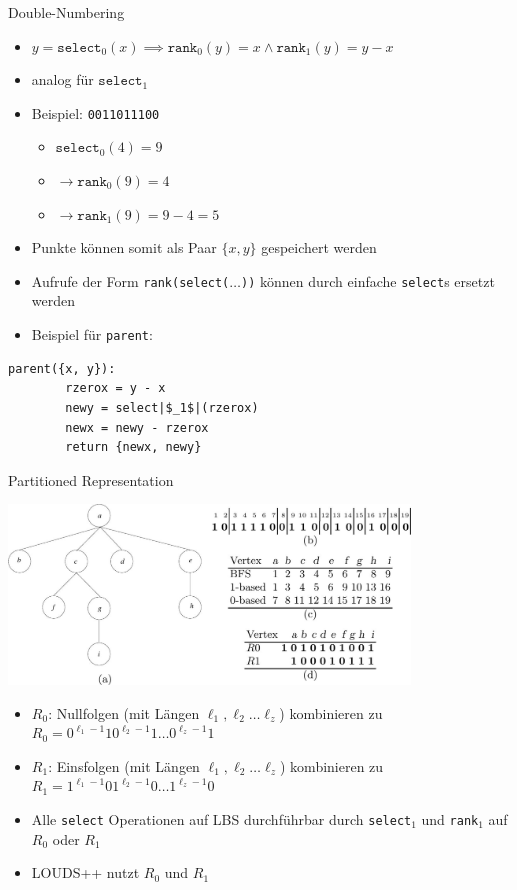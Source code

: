 \documentclass[ngerman,aspectratio=169,10pt]{beamer}
\begin{document}
\begin{frame}[fragile]{Double-Numbering}
    \begin{itemize}
        \item $y=\texttt{select}_0(x)\implies \texttt{rank}_0(y)=x\wedge \texttt{rank}_1(y)=y-x$
        \item analog für $\texttt{select}_1$
        \pause
        \item Beispiel: \texttt{0011011100}
            \begin{itemize}
                \item $\texttt{select}_0(4)=9$
                \item $\rightarrow \texttt{rank}_0(9)=4$
                \item $\rightarrow \texttt{rank}_1(9)=9-4=5$
            \end{itemize}
        \pause
        \item Punkte können somit als Paar $\{x, y\}$ gespeichert werden
        \item Aufrufe der Form \texttt{rank(select($\dots$))} können durch einfache \texttt{select}s ersetzt werden
        \item Beispiel für \texttt{parent}:
    \end{itemize}
	\begin{lstlisting}[escapechar=|]
	parent({x, y}):
		rzerox = y - x
		newy = select|$_1$|(rzerox)
		newx = newy - rzerox
		return {newx, newy}
	\end{lstlisting}
\end{frame}

\begin{frame}{Partitioned Representation}
    \begin{center}
        \includegraphics[width=0.8\textwidth]{LOUDS.jpg}
    \end{center}
    \begin{itemize}
        \item $R_0$: Nullfolgen (mit Längen $\ell_1,\ell_2\ldots\ell_z$) kombinieren zu $R_0=0^{\ell_1-1}10^{\ell_2-1}1\ldots0^{\ell_z-1}1$
        \item  $R_1$: Einsfolgen (mit Längen $\ell_1,\ell_2\ldots\ell_z$) kombinieren zu $R_1=1^{\ell_1-1}01^{\ell_2-1}0\ldots1^{\ell_z-1}0$
        \item Alle \texttt{select} Operationen auf LBS durchführbar durch \texttt{select}$_1$ und \texttt{rank}$_1$ auf $R_0$ oder $R_1$
        \item LOUDS++ nutzt $R_0$ und $R_1$
    \end{itemize}
\end{frame}
\end{document}
